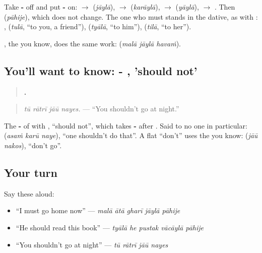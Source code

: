 Take \textbf{-} off and put \textbf{-} on: \textbf{} $\to$ \textbf{} (\emph{jāylā}), \textbf{} $\to$ \textbf{} (\emph{karāylā}), \textbf{} $\to$ \textbf{} (\emph{yāylā}), \textbf{} $\to$ \textbf{}. Then \textbf{} (\emph{pāhije}), which does not change. The one who must stands in the dative, as with \textbf{}: \textbf{}, \textbf{} (\emph{tulā}, \textquotedblleft{}to you, a friend\textquotedblright{}), \textbf{} (\emph{tyālā}, \textquotedblleft{}to him\textquotedblright{}), \textbf{} (\emph{tilā}, \textquotedblleft{}to her\textquotedblright{}).

\textbf{}, the \textbf{} you know, does the same work: \textbf{  } (\emph{malā jāylā havaṁ}).

\subsection*{You'll want to know: - , 'should not'}
\begin{quote}
\textbf{   .}
\end{quote}

\begin{quote}
\emph{tū rātrī jāū nayes.} — \textquotedblleft{}You shouldn't go at night.\textquotedblright{}
\end{quote}

The \textbf{-} of \textbf{ } with \textbf{}, \textquotedblleft{}should not\textquotedblright{}, which takes \textbf{-} after \textbf{}. Said to no one in particular: \textbf{  } (\emph{asaṁ karū naye}), \textquotedblleft{}one shouldn't do that\textquotedblright{}. A flat \textquotedblleft{}don't\textquotedblright{} uses the \textbf{} you know: \textbf{ } (\emph{jāū nakos}), \textquotedblleft{}don't go\textquotedblright{}.

\subsection*{Your turn}
Say these aloud:

\begin{itemize}
\raggedright
  \item \textquotedblleft{}I must go home now\textquotedblright{} — \emph{malā ātā gharī jāylā pāhije}
  \item \textquotedblleft{}He should read this book\textquotedblright{} — \emph{tyālā he pustak vācāylā pāhije}
  \item \textquotedblleft{}You shouldn't go at night\textquotedblright{} — \emph{tū rātrī jāū nayes}
\end{itemize}

